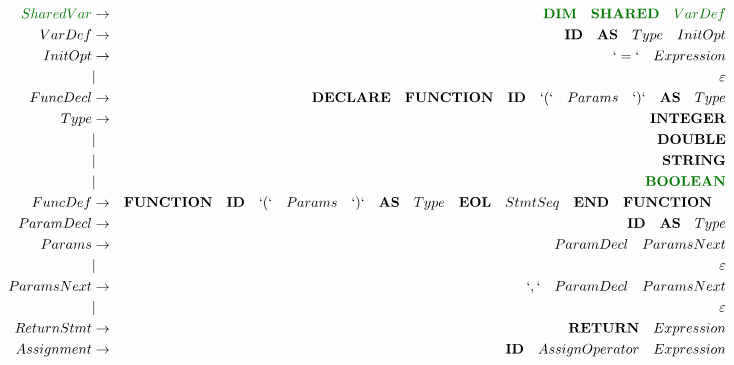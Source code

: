 \documentclass[a4paper,11pt,leqno]{article}
\begin{document}
\begin{landscape}
\begin{eqnarray}
\textcolor{green1}{SharedVar}&		 \rightarrow		   & \textcolor{green1}{\textbf{DIM}\quad \textbf{SHARED}\quad VarDef} \\
VarDef		& \rightarrow		& \textbf{ID}\quad \textbf{AS}\quad Type \quad InitOpt\\
InitOpt		&	   \rightarrow	& `=`\quad Expression \\
			&		|			& \varepsilon \\
FuncDecl	&  \rightarrow		& \textbf{DECLARE}\quad \textbf{FUNCTION}\quad \textbf{ID}\quad `(` \quad Params \quad`)`\quad \textbf{AS}\quad Type   \\
Type		&	 \rightarrow	&	 \textbf{INTEGER}	 \\
			&		|			& \textbf{DOUBLE}	\\
			&		|			& \textbf{STRING}	\\
			&		|			& \textcolor{green1}{\textbf{BOOLEAN}}	\\
	FuncDef    &	\rightarrow    & \textbf{FUNCTION}\quad \textbf{ID}\quad `(`\quad Params\quad `)`\quad \textbf{AS}\quad Type\quad \textbf{EOL}\quad StmtSeq\quad \textbf{END}\quad \textbf{FUNCTION}\quad \\
ParamDecl	&	\rightarrow   & {\textbf{ID}\quad \textbf{AS}\quad Type}	\\
Params		&	 \rightarrow	& {ParamDecl}\quad ParamsNext  \\
			&	 |				& \varepsilon			  \\
ParamsNext	&	 \rightarrow	& `,`\quad {ParamDecl}\quad  ParamsNext   \\
			&	 |				& \varepsilon			  \\
ReturnStmt	&	\rightarrow		& \textbf{RETURN}\quad Expression	  \\
Assignment	& \rightarrow		& \textbf{ID}\quad AssignOperator \quad Expression \\

\end{eqnarray}
\end{landscape}
\end{document}
